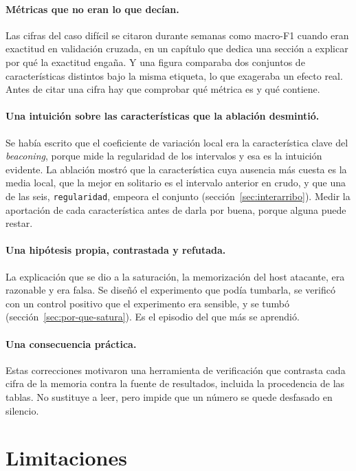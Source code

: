 \paragraph{Métricas que no eran lo que decían.} Las cifras del caso difícil se
citaron durante semanas como macro-F1 cuando eran exactitud en validación
cruzada, en un capítulo que dedica una sección a explicar por qué la exactitud
engaña. Y una figura comparaba dos conjuntos de características distintos bajo
la misma etiqueta, lo que exageraba un efecto real. Antes de citar una cifra hay
que comprobar qué métrica es y qué contiene.

\paragraph{Una intuición sobre las características que la ablación desmintió.}
Se había escrito que el coeficiente de variación local era la característica
clave del \emph{beaconing}, porque mide la regularidad de los intervalos y esa es
la intuición evidente. La ablación mostró que la característica cuya ausencia más
cuesta es la media local, que la mejor en solitario es el intervalo anterior en
crudo, y que una de las seis, \texttt{regularidad}, empeora el conjunto
(sección~\ref{sec:interarribo}). Medir la aportación de cada
característica antes de darla por buena, porque alguna puede restar.

\paragraph{Una hipótesis propia, contrastada y refutada.} La explicación que se
dio a la saturación, la memorización del host atacante, era razonable y era
falsa. Se diseñó el experimento que podía tumbarla, se verificó con un control
positivo que el experimento era sensible, y se tumbó
(sección~\ref{sec:por-que-satura}). Es el episodio del que más se aprendió.

\paragraph{Una consecuencia práctica.} Estas correcciones motivaron una
herramienta de verificación que contrasta cada cifra de la memoria contra la
fuente de resultados, incluida la procedencia de las tablas. No sustituye a
leer, pero impide que un número se quede desfasado en silencio.

\section{Limitaciones}
\label{sec:limitaciones}

